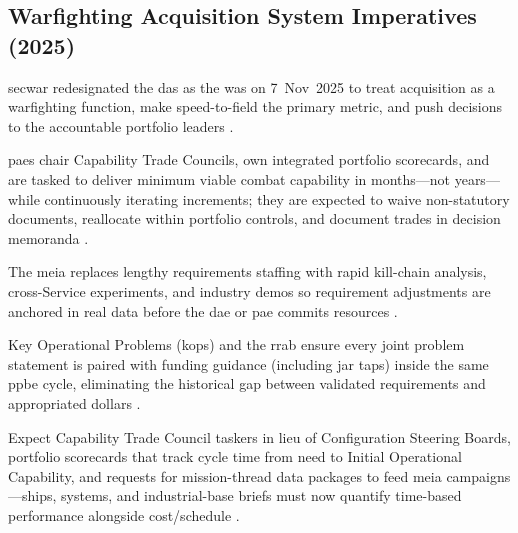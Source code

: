 \documentclass[../main.tex]{subfiles}
\begin{document}
\subsection{Warfighting Acquisition System Imperatives (2025)}
\begin{description}[style=nextline,labelsep=0.5em,font=\bfseries]
  \item[\textbf{Purpose.}] \ac{secwar} redesignated the \ac{das} as the \ac{was} on 7~Nov~2025 to treat acquisition as a warfighting function, make speed-to-field the primary metric, and push decisions to the accountable portfolio leaders \autocite{secwar-was-memo-2025}.
  \item[\textbf{Portfolio accountability.}] \acp{pae} chair Capability Trade Councils, own integrated portfolio scorecards, and are tasked to deliver minimum viable combat capability in months---not years---while continuously iterating increments; they are expected to waive non-statutory documents, reallocate within portfolio controls, and document trades in decision memoranda \autocite{secwar-acq-transformation-2025,secwar-was-memo-2025}.
  \item[\textbf{Mission engineering and experimentation.}] The \ac{meia} replaces lengthy requirements staffing with rapid kill-chain analysis, cross-Service experiments, and industry demos so requirement adjustments are anchored in real data before the \ac{dae} or \ac{pae} commits resources \autocite{secwar-was-memo-2025,secwar-jcids-reform-2025}.
  \item[\textbf{Requirements--budget coupling.}] Key Operational Problems (\acp{kop}) and the \ac{rrab} ensure every joint problem statement is paired with funding guidance (including \ac{jar} taps) inside the same \ac{ppbe} cycle, eliminating the historical gap between validated requirements and appropriated dollars \autocite{secwar-jcids-reform-2025}.
  \item[\textbf{Implications for EDOs.}] Expect Capability Trade Council taskers in lieu of Configuration Steering Boards, portfolio scorecards that track cycle time from need to Initial Operational Capability, and requests for mission-thread data packages to feed \ac{meia} campaigns---ships, systems, and industrial-base briefs must now quantify time-based performance alongside cost/schedule \autocite{secwar-was-memo-2025,secwar-acq-transformation-2025}.
\end{description}
\end{document}
